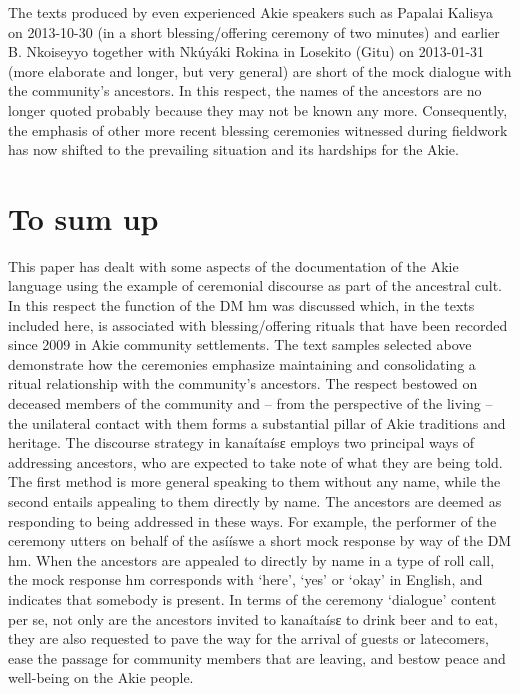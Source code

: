 \documentclass[output=paper,colorlinks,citecolor=brown]{langscibook}
\begin{document}

The texts produced by even experienced Akie speakers such as Papalai Kalisya on 2013-10-30 (in a short blessing/offering ceremony of two minutes) and earlier B. Nkoiseyyo together with Nkúyáki Rokina in Losekito (Gitu) on 2013-01-31 (more elaborate and longer, but very general) are short of the mock dialogue with the community’s ancestors. In this respect, the names of the ancestors are no longer quoted probably because they may not be known any more. Consequently, the emphasis of other more recent blessing ceremonies witnessed during fieldwork has now shifted to the prevailing situation and its hardships for the Akie.

\section{To sum up}\label{sec:legere:5}

This paper has dealt with some aspects of the documentation of the Akie language using the example of ceremonial discourse as part of the ancestral cult.  In this respect the function of the DM hm was discussed which, in the texts included here, is associated with blessing/offering rituals that have been recorded since 2009 in Akie community settlements. 
The text samples selected above demonstrate how the ceremonies emphasize maintaining and consolidating a ritual relationship with the community’s ancestors. The respect bestowed on deceased members of the community and – from the perspective of the living – the unilateral contact with them forms a substantial pillar of Akie traditions and heritage.
The discourse strategy in kanaítaísɛ employs two principal ways of addressing ancestors, who are expected to take note of what they are being told. The first method is more general speaking to them without any name, while the second entails appealing to them directly by name. The ancestors are deemed as responding to being addressed in these ways. For example, the performer of the ceremony utters on behalf of the asííswe a short mock response by way of the DM hm. When the ancestors are appealed to directly by name in a type of roll call, the mock response hm corresponds with ‘here’, ‘yes’ or ‘okay’ in English, and indicates that somebody is present. In terms of the ceremony ‘dialogue’ content per se, not only are the ancestors invited to kanaítaísɛ to drink beer and to eat, they are also requested to pave the way for the arrival of guests or latecomers, ease the passage for community members that are leaving, and bestow peace and well-being on the Akie people.
\end{document}
